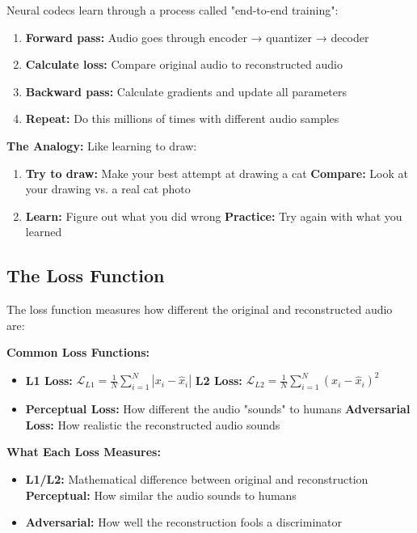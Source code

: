 \documentclass[12pt]{article}
\begin{document}
Neural codecs learn through a process called "end-to-end training":
\begin{enumerate}
    \item \textbf{Forward pass:} Audio goes through encoder → quantizer → decoder
    \item \textbf{Calculate loss:} Compare original audio to reconstructed audio
    \item \textbf{Backward pass:} Calculate gradients and update all parameters
    \item \textbf{Repeat:} Do this millions of times with different audio samples
\end{enumerate}

\textbf{The Analogy:} Like learning to draw:
\begin{enumerate}
    \item \textbf{Try to draw:} Make your best attempt at drawing a cat
    \textbf{Compare:} Look at your drawing vs. a real cat photo
    \item \textbf{Learn:} Figure out what you did wrong
    \textbf{Practice:} Try again with what you learned
\end{enumerate}

\subsection{The Loss Function}

The loss function measures how different the original and reconstructed audio are:

\textbf{Common Loss Functions:}
\begin{itemize}
    \item \textbf{L1 Loss:} $\mathcal{L}_{L1} = \frac{1}{N} \sum_{i=1}^N |x_i - \hat{x}_i|$
    \textbf{L2 Loss:} $\mathcal{L}_{L2} = \frac{1}{N} \sum_{i=1}^N (x_i - \hat{x}_i)^2$
    \item \textbf{Perceptual Loss:} How different the audio "sounds" to humans
    \textbf{Adversarial Loss:} How realistic the reconstructed audio sounds
\end{itemize}

\textbf{What Each Loss Measures:}
\begin{itemize}
    \item \textbf{L1/L2:} Mathematical difference between original and reconstruction
    \textbf{Perceptual:} How similar the audio sounds to humans
    \item \textbf{Adversarial:} How well the reconstruction fools a discriminator
\end{itemize}
\end{document}
